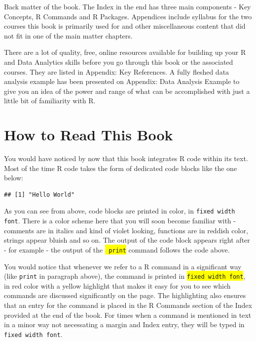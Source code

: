 \documentclass[10pt, letterpaper, twoside]{memoir}\usepackage{knitr}
\newcommand\rcommand[1]{
\colorbox{yellow}{\texttt{\color{red} #1}}
\index{R Commands!#1}
}
\begin{document}
Back matter of the book. The Index in the end has three main components - Key Concepts, R Commands and R Packages. Appendices include syllabus for the two courses this book is primarily used for and other miscellaneous content that did not fit in one of the main matter chapters.

There are a lot of quality, free, online resources available for building up your R and Data Analytics skills before you go through this book or the associated courses. They are listed in Appendix: Key References. A fully fleshed data analysis example has been presented on Appendix: Data Analysis Example to give you an idea of the power and range of what can be accomplished with just a little bit of familiarity with R.

\section*{How to Read This Book}

You would have noticed by now that this book integrates R code within its text. Most of the time R code takes the form of dedicated code blocks like the one below:  

\begin{knitrout}
\color{fgcolor}\begin{kframe}
\begin{alltt}
\hlstd{(}\hlstd{)}
\end{alltt}
\begin{verbatim}
## [1] "Hello World"
\end{verbatim}
\end{kframe}
\end{knitrout}

As you can see from above, code blocks are printed in color, in \texttt{fixed width font}. There is a color scheme here that you will soon become familiar with - comments are in italics and kind of violet looking, functions are in reddish color, strings appear bluish and so on. The output of the code block appears right after - for example - the output of the \rcommand{print} command follows the code above.

You would notice that whenever we refer to a R command in a significant way (like \texttt{print} in paragraph above), the command is printed in \colorbox{yellow}{\texttt{fixed width font}}, in red color with a yellow highlight that makes it easy for you to see which commands are discussed significantly on the page. The highlighting also ensures that an entry for the command is placed in the R Commands section of the Index provided at the end of the book. For times when a command is mentioned in text in a minor way not necessating a margin and Index entry, they will be typed in \texttt{fixed width font}.
\end{document}
